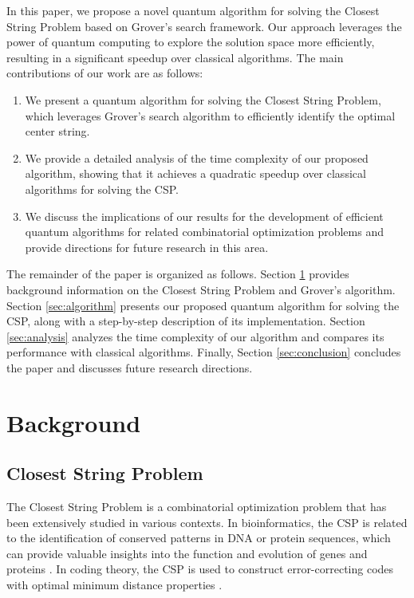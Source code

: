 In this paper, we propose a novel quantum algorithm for solving the Closest String Problem based on Grover's search framework. Our approach leverages the power of quantum computing to explore the solution space more efficiently, resulting in a significant speedup over classical algorithms. The main contributions of our work are as follows:

\begin{enumerate}
  \item We present a quantum algorithm for solving the Closest String Problem, which leverages Grover's search algorithm to efficiently identify the optimal center string.
  
  \item We provide a detailed analysis of the time complexity of our proposed algorithm, showing that it achieves a quadratic speedup over classical algorithms for solving the CSP.
  
  \item We discuss the implications of our results for the development of efficient quantum algorithms for related combinatorial optimization problems and provide directions for future research in this area.
\end{enumerate}

The remainder of the paper is organized as follows. Section \ref{sec:background} provides background information on the Closest String Problem and Grover's algorithm. Section \ref{sec:algorithm} presents our proposed quantum algorithm for solving the CSP, along with a step-by-step description of its implementation. Section \ref{sec:analysis} analyzes the time complexity of our algorithm and compares its performance with classical algorithms. Finally, Section \ref{sec:conclusion} concludes the paper and discusses future research directions.

\section{Background}\label{sec:background}

\subsection{Closest String Problem}

The Closest String Problem is a combinatorial optimization problem that has been extensively studied in various contexts. In bioinformatics, the CSP is related to the identification of conserved patterns in DNA or protein sequences, which can provide valuable insights into the function and evolution of genes and proteins \cite{gramm2002fixed}. In coding theory, the CSP is used to construct error-correcting codes with optimal minimum distance properties \cite{lanctot2003closest}.


